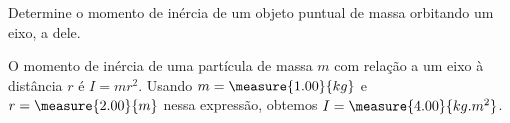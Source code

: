 \begin{question}
    Determine o momento de inércia de um objeto puntual de massa  orbitando um eixo, a  dele.

    \begin{answer}
    \end{answer}

    \begin{solution}
      O momento de inércia de uma partícula de massa $m$ com relação a um eixo à distância $r$ é $I = mr^2$.
      Usando $m = \measure{1.00}{kg}$ e $r = \measure{2.00}{m}$ nessa expressão, obtemos $I = \measure{4.00}{kg.m^2}$.
    \end{solution}
\end{question}